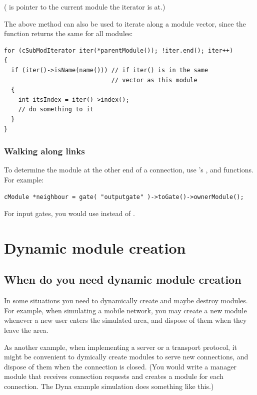 ( is pointer to the current module the iterator is at.)


The above method can also be used to iterate along a module
vector, since the 
function returns the same for all modules:

\begin{verbatim}
for (cSubModIterator iter(*parentModule()); !iter.end(); iter++)
{
  if (iter()->isName(name())) // if iter() is in the same
                              // vector as this module
  {
    int itsIndex = iter()->index();
    // do something to it
  }
}
\end{verbatim}


\subsubsection{Walking along links}


To determine the module at the other end of a connection, use
's ,  and
 functions. For example:

\begin{verbatim}
cModule *neighbour = gate( "outputgate" )->toGate()->ownerModule();
\end{verbatim}


For input gates, you would use  instead of .





\section{Dynamic module creation}
\label{ch:simple-modules:dynamic-module-creation}

\subsection{When do you need dynamic module creation}

In some situations you need to dynamically create and maybe destroy
modules. For example, when simulating a mobile network,
you may create a new module whenever a new user enters
the simulated area, and dispose of them when they leave the area.

As another example, when implementing a server or a transport
protocol, it might be convenient to dymically create modules
to serve new connections, and dispose of them when the connection
is closed. (You would write a manager module that receives connection
requests and creates a module for each connection.
The Dyna example simulation does something like this.)

